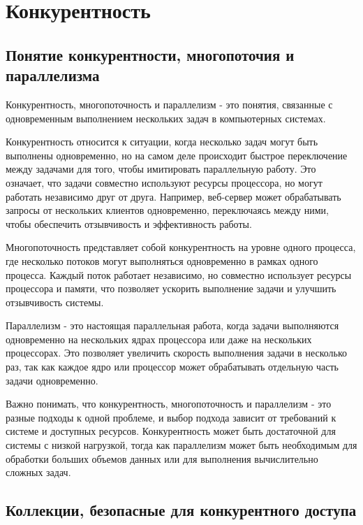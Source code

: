 
\newpage %
\chapter{Конкурентность}

\section{Понятие конкурентности, многопоточия и параллелизма}

Конкурентность, многопоточность и параллелизм - это понятия, связанные с одновременным выполнением нескольких задач в компьютерных системах.

Конкурентность относится к ситуации, когда несколько задач могут быть выполнены одновременно, но на самом деле происходит быстрое переключение между задачами для того, чтобы имитировать параллельную работу. Это означает, что задачи совместно используют ресурсы процессора, но могут работать независимо друг от друга. Например, веб-сервер может обрабатывать запросы от нескольких клиентов одновременно, переключаясь между ними, чтобы обеспечить отзывчивость и эффективность работы.

Многопоточность представляет собой конкурентность на уровне одного процесса, где несколько потоков могут выполняться одновременно в рамках одного процесса. Каждый поток работает независимо, но совместно использует ресурсы процессора и памяти, что позволяет ускорить выполнение задачи и улучшить отзывчивость системы.

Параллелизм - это настоящая параллельная работа, когда задачи выполняются одновременно на нескольких ядрах процессора или даже на нескольких процессорах. Это позволяет увеличить скорость выполнения задачи в несколько раз, так как каждое ядро или процессор может обрабатывать отдельную часть задачи одновременно.

Важно понимать, что конкурентность, многопоточность и параллелизм - это разные подходы к одной проблеме, и выбор подхода зависит от требований к системе и доступных ресурсов. Конкурентность может быть достаточной для системы с низкой нагрузкой, тогда как параллелизм может быть необходимым для обработки больших объемов данных или для выполнения вычислительно сложных задач.

\section{Коллекции, безопасные для конкурентного доступа}

